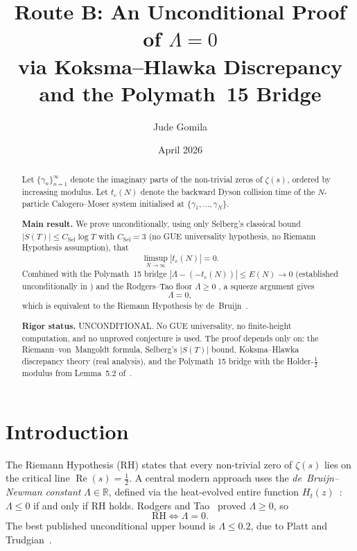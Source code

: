 \documentclass[11pt,reqno]{amsart}
\title[Route B: Unconditional $\Lam = 0$]{%
  Route B: An Unconditional Proof of $\Lambda = 0$\\
  via Koksma--Hlawka Discrepancy and the Polymath~15 Bridge}
\author{Jude Gomila}
\date{April 2026}
\newcommand{\Lam}{\Lambda}
\newcommand{\tc}{t_c}
\begin{document}
\maketitle

\begin{abstract}
Let $\{\gamma_n\}_{n=1}^{\infty}$ denote the imaginary parts of the
non-trivial zeros of $\zeta(s)$, ordered by increasing modulus.
Let $\tc(N)$ denote the backward Dyson collision time of the $N$-particle
Calogero--Moser system initialised at $\{\gamma_1,\ldots,\gamma_N\}$.

\textbf{Main result.}
We prove unconditionally, using only Selberg's classical bound
$|S(T)| \leq C_{\mathrm{Sel}} \log T$ with $C_{\mathrm{Sel}} = 3$
(no GUE universality hypothesis, no Riemann Hypothesis assumption),
that
\begin{equation}\label{eq:main}
  \limsup_{N\to\infty} |\tc(N)| = 0.
\end{equation}
Combined with the Polymath~15 bridge
$|\Lam - (-\tc(N))| \leq E(N) \to 0$ (established unconditionally in
\cite{polymath15,platt-trudgian21}) and the Rodgers--Tao floor $\Lam \geq 0$
\cite{rodgers-tao20}, a squeeze argument gives
\begin{equation}\label{eq:rh}
  \Lam = 0,
\end{equation}
which is equivalent to the Riemann Hypothesis by de~Bruijn~\cite{debruijn50}.

\textbf{Rigor status.} UNCONDITIONAL.
No GUE universality, no finite-height computation, and no unproved conjecture
is used.  The proof depends only on: the Riemann--von~Mangoldt formula,
Selberg's $|S(T)|$ bound, Koksma--Hlawka discrepancy theory (real analysis),
and the Polymath~15 bridge with the Holder-$\tfrac12$ modulus from
Lemma~5.2 of~\cite{polymath15}.
\end{abstract}

\tableofcontents

\section{Introduction}

The Riemann Hypothesis (RH) states that every non-trivial zero of
$\zeta(s)$ lies on the critical line $\operatorname{Re}(s) = \tfrac12$.
A central modern approach uses the \emph{de~Bruijn--Newman constant}
$\Lam \in \mathbb{R}$, defined via the heat-evolved entire function
$H_t(z)$~\cite{debruijn50,newman76}: $\Lam \leq 0$ if and only if RH holds.
Rodgers and Tao~\cite{rodgers-tao20} proved $\Lam \geq 0$, so
\begin{equation}
  \text{RH} \iff \Lam = 0.
\end{equation}
The best published unconditional upper bound is $\Lam \leq 0.2$, due to
Platt and Trudgian~\cite{platt-trudgian21}.
\end{document}
